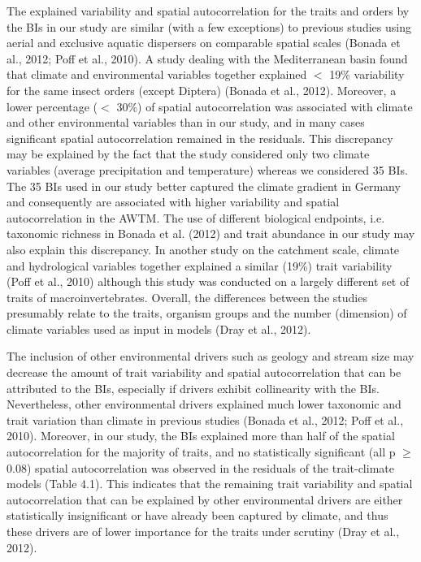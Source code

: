 The explained variability and spatial autocorrelation for the traits and orders by the BIs in our study are similar (with a few exceptions) to previous studies using aerial and exclusive aquatic dispersers on comparable spatial scales (Bonada et al., 2012; Poff et al., 2010). A study dealing with the Mediterranean basin found that climate and environmental variables together explained $<$ 19\% variability for the same insect orders (except Diptera) (Bonada et al., 2012). Moreover, a lower percentage ($<$ 30\%) of spatial autocorrelation was associated with climate and other environmental variables than in our study, and in many cases significant spatial autocorrelation remained in the residuals. This discrepancy may be explained by the fact that the study considered only two climate variables (average precipitation and temperature) whereas we considered 35 BIs. The 35 BIs used in our study better captured the climate gradient in Germany and consequently are associated with higher variability and spatial autocorrelation in the AWTM. The use of different biological endpoints, i.e. taxonomic richness in Bonada et al. (2012) and trait abundance in our study may also explain this discrepancy. In another study on the catchment scale, climate and hydrological variables together explained a similar (19\%) trait variability (Poff et al., 2010) although this study was conducted on a largely different set of traits of macroinvertebrates. Overall, the differences between the studies presumably relate to the traits, organism groups and the number (dimension) of climate variables used as input in models (Dray et al., 2012).

The inclusion of other environmental drivers such as geology and stream size may decrease the amount of trait variability and spatial autocorrelation that can be attributed to the BIs, especially if drivers exhibit collinearity with the BIs. Nevertheless, other environmental drivers explained much lower taxonomic and trait variation than climate in previous studies (Bonada et al., 2012; Poff et al., 2010). Moreover, in our study, the BIs explained more than half of the spatial autocorrelation for the majority of traits, and no statistically significant (all p $\geq$ 0.08) spatial autocorrelation was observed in the residuals of the trait-climate models (Table 4.1). This indicates that the remaining trait variability and spatial autocorrelation that can be explained by other environmental drivers are either statistically insignificant or have already been captured by climate, and thus these drivers are of lower importance for the traits under scrutiny (Dray et al., 2012).

